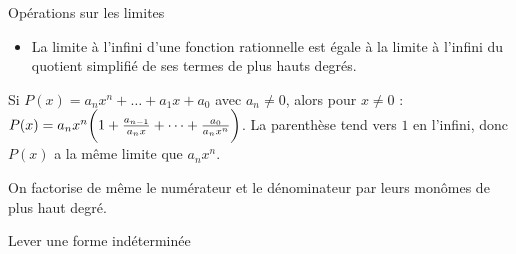 \begin{acoller}{Opérations sur les limites}
\begin{remark}
\begin{itemize}
		\item[\ding{183}] La limite à l’infini d’une fonction rationnelle est égale à la limite à l’infini du
		quotient simplifié de ses termes de plus hauts degrés.
	\end{itemize}
\end{remark}
\begin{preuve}
 Si $P(x)=a_nx^n+\dots+a_1x+a_0$ avec $a_n\neq 0$, alors pour $x\neq 0$ : $P(x)=a_nx^n\bigg(1+\frac{a_{n-1}}{a_nx}+\dots+\frac{a_0}{a_nx^n}\bigg)$. La parenthèse tend vers $1$ en l'infini, donc $P(x)$ a la même limite que $a_nx^n$.
\par {} On factorise de même le numérateur et le dénominateur par leurs monômes de plus haut degré.
\end{preuve}
\end{acoller}
\begin{acoller}{Lever une forme indéterminée}
\begin{center}

\end{center}
\end{acoller}
\collerici
{}
